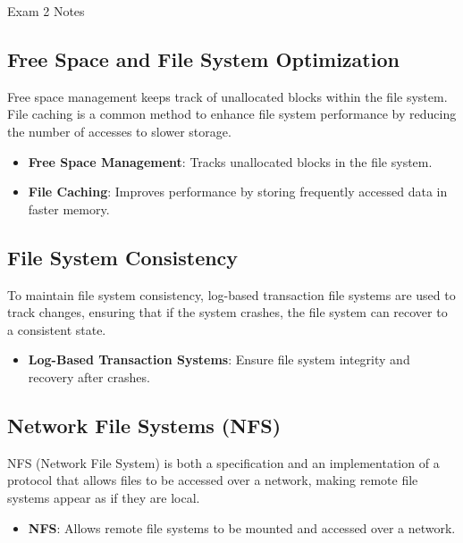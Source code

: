 \begin{examnotes}{Exam 2 Notes}
    \subsection*{Free Space and File System Optimization}
    
    Free space management keeps track of unallocated blocks within the file system. File caching is a common method to enhance file system performance by reducing the number of accesses to slower storage.
    
    \begin{highlight}
        \begin{itemize}
            \item \textbf{Free Space Management}: Tracks unallocated blocks in the file system.
            \item \textbf{File Caching}: Improves performance by storing frequently accessed data in faster memory.
        \end{itemize}
    \end{highlight}
    
    \subsection*{File System Consistency}
    
    To maintain file system consistency, log-based transaction file systems are used to track changes, ensuring that if the system crashes, the file system can recover to a consistent state.
    
    \begin{highlight}
        \begin{itemize}
            \item \textbf{Log-Based Transaction Systems}: Ensure file system integrity and recovery after crashes.
        \end{itemize}
    \end{highlight}
    
    \subsection*{Network File Systems (NFS)}
    
    NFS (Network File System) is both a specification and an implementation of a protocol that allows files to be accessed over a network, making remote file systems appear as if they are local.
    
    \begin{highlight}
        \begin{itemize}
            \item \textbf{NFS}: Allows remote file systems to be mounted and accessed over a network.
        \end{itemize}
    \end{highlight}
\end{examnotes}


